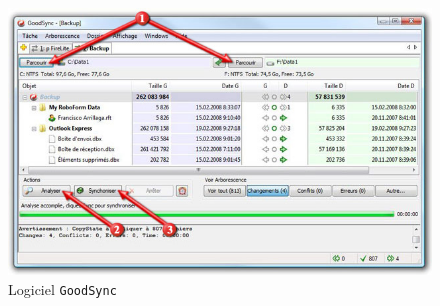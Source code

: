\begin{figure}[!htbp]
\centering
\includegraphics[scale=0.6]{images/Goodsync}
\caption{Logiciel \texttt{GoodSync}}
\end{figure}





